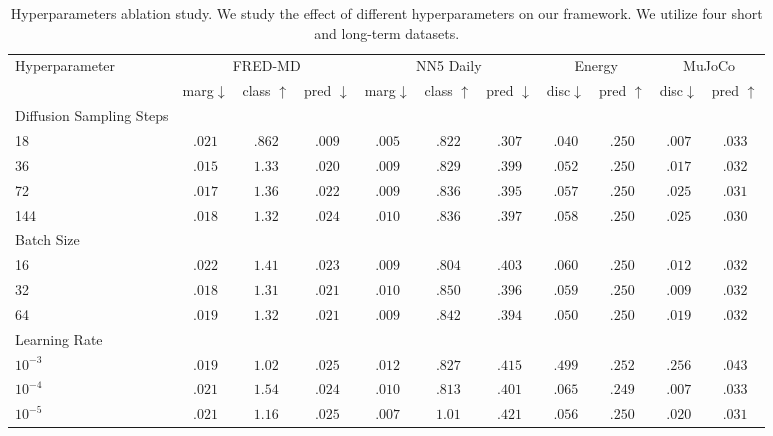 \documentclass{article}
\begin{document}
\begin{table}[!ht]
    \centering
    \caption{Hyperparameters ablation study. We study the effect of different hyperparameters on our framework. We utilize four short and long-term datasets.}
    \label{tab:hyperparameters_abl}
    \setlength{\tabcolsep}{2.5pt}
    \begin{tabular}{l|ccc|ccc|cc|cc}
        \toprule
        Hyperparameter & \multicolumn{3}{c|}{FRED-MD} & \multicolumn{3}{c|}{NN5 Daily} & \multicolumn{2}{c|}{Energy} & \multicolumn{2}{c}{MuJoCo} \\ 
         & marg$\downarrow$ & class $\uparrow$ & pred $\downarrow$ & marg$\downarrow$ & class $\uparrow$ & pred $\downarrow$ & disc$\downarrow$ & pred $\uparrow$ & disc$\downarrow$ & pred $\uparrow$   \\
        \midrule
        Diffusion Sampling Steps\\
        18 & $.021$ & $.862$ & $.009$ & $.005$ & $.822$ & $.307$ & $.040$ & $.250$ & $.007$ & $.033$ \\
        36 & $.015$ & $1.33$ & $.020$ & $.009$ & $.829$ & $.399$ & $.052$ & $.250$ & $.017$ & $.032$ \\
        72 & $.017$ & $1.36$ & $.022$ & $.009$ & $.836$ & $.395$ & $.057$ & $.250$ & $.025$ & $.031$ \\
        144 & $.018$ & $1.32$ & $.024$ & $.010$ & $.836$ & $.397$ & $.058$ & $.250$ & $.025$ & $.030$ \\
        \midrule
        Batch Size \\
        16 & $.022$ & $1.41$ & $.023$ & $.009$ & $.804$ & $.403$ & $.060$ & $.250$ & $.012$ & $.032$ \\
        32 & $.018$ & $1.31$ & $.021$ & $.010$ & $.850$ & $.396$ & $.059$ & $.250$ & $.009$ & $.032$ \\
        64 & $.019$ & $1.32$ & $.021$ & $.009$ & $.842$ & $.394$ & $.050$ & $.250$ & $.019$ & $.032$ \\
        \midrule
        Learning Rate\\
        $10^{-3}$ & $.019$ & $1.02$ & $.025$ & $.012$ & $.827$ & $.415$ & $.499$ & $.252$ & $.256$ & $.043$ \\
        $10^{-4}$ & $.021$ & $1.54$ & $.024$ & $.010$ & $.813$ & $.401$ & $.065$ & $.249$ & $.007$ & $.033$ \\
        $10^{-5}$ & $.021$ & $1.16$ & $.025$ & $.007$ & $1.01$ & $.421$ & $.056$ & $.250$ & $.020$ & $.031$ \\
        \bottomrule
    \end{tabular}
\end{table}
\end{document}
